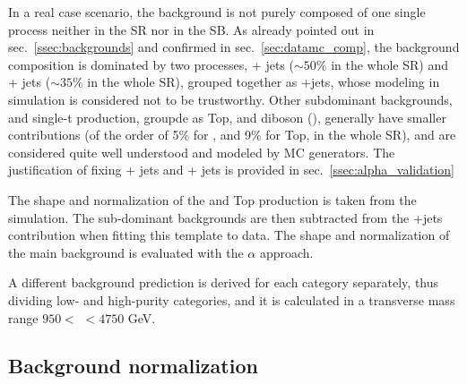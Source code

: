 \noindent In a real case scenario, the background is not purely composed of one single process neither in the SR nor in the SB. As already pointed out in sec.~\ref{ssec:backgrounds} and confirmed in sec.~\ref{sec:datamc_comp}, the background composition is dominated by two processes, \Z + jets ($\sim 50\%$ in the whole SR) and \W + jets ($\sim 35\%$ in the whole SR), grouped together as \V+jets, whose modeling in simulation is considered not to be trustworthy. Other subdominant backgrounds, \ttbar and single-t production, groupde as Top, and diboson (\V\V), generally have smaller contributions (of the order of 5\% for \V\V, and 9\% for Top, in the whole SR), and are considered quite well understood and modeled by MC generators. The justification of fixing \W + jets and \Z + jets is provided in sec.~\ref{ssec:alpha_validation}

\noindent The shape and normalization of the \V\V and Top production is taken from the simulation. The sub-dominant backgrounds are then subtracted from the \V+jets contribution when fitting this template to data. The shape and normalization of the main background is evaluated with the $\alpha$ approach.


\noindent A different background prediction is derived for each category separately, thus dividing low- and high-purity categories, and it is calculated in a transverse mass range $950 <$ \mtVZ $<4750$ GeV.

\subsection{Background normalization}\label{ssec:alphaNorm}

